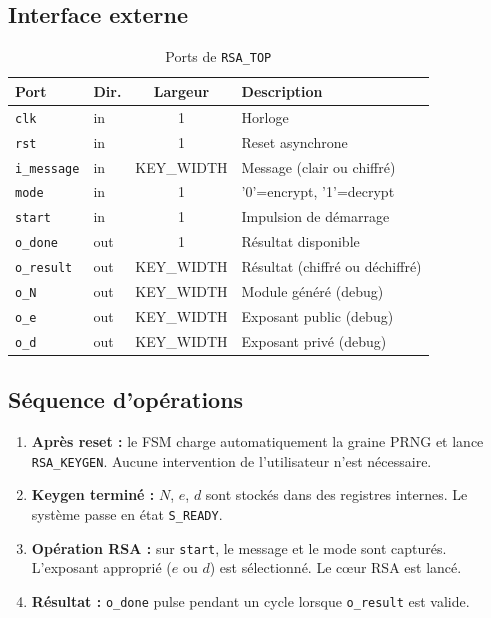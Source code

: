 \documentclass[12pt,a4paper]{report}
\begin{document}
\subsection{Interface externe}
\begin{table}[H]
\centering
\caption{Ports de \texttt{RSA\_TOP}}
\begin{tabular}{llcp{5cm}}
\toprule
\textbf{Port} & \textbf{Dir.} & \textbf{Largeur} & \textbf{Description} \\
\midrule
\texttt{clk}       & in  & 1 & Horloge \\
\texttt{rst}       & in  & 1 & Reset asynchrone \\
\texttt{i\_message} & in  & KEY\_WIDTH & Message (clair ou chiffré) \\
\texttt{mode}      & in  & 1 & '0'=encrypt, '1'=decrypt \\
\texttt{start}     & in  & 1 & Impulsion de démarrage \\
\texttt{o\_done}    & out & 1 & Résultat disponible \\
\texttt{o\_result}  & out & KEY\_WIDTH & Résultat (chiffré ou déchiffré) \\
\texttt{o\_N}       & out & KEY\_WIDTH & Module généré (debug) \\
\texttt{o\_e}       & out & KEY\_WIDTH & Exposant public (debug) \\
\texttt{o\_d}       & out & KEY\_WIDTH & Exposant privé (debug) \\
\bottomrule
\end{tabular}
\end{table}

\subsection{Séquence d'opérations}

\begin{enumerate}
  \item \textbf{Après reset :} le FSM charge automatiquement la graine
        PRNG et lance \texttt{RSA\_KEYGEN}. Aucune intervention de
        l'utilisateur n'est nécessaire.
  \item \textbf{Keygen terminé :} $N$, $e$, $d$ sont stockés dans des
        registres internes. Le système passe en état \texttt{S\_READY}.
  \item \textbf{Opération RSA :} sur \texttt{start}, le message et le mode
        sont capturés. L'exposant approprié ($e$ ou $d$) est sélectionné.
        Le cœur RSA est lancé.
  \item \textbf{Résultat :} \texttt{o\_done} pulse pendant un cycle
        lorsque \texttt{o\_result} est valide.
\end{enumerate}
\end{document}
